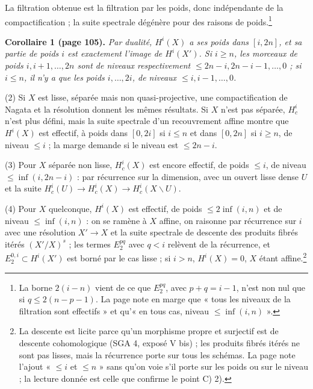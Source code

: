 \documentclass[11pt,a4paper]{article}
\begin{document}
La filtration obtenue est la filtration par les poids, donc indépendante de la
compactification ; la suite spectrale dégénère pour des raisons de
poids.\footnote{La borne $2(i-n)$ vient de ce que $E_{2}^{pq}$, avec $p + q =
i-1$, n'est non nul que si $q \leqslant 2(n-p-1)$. La page note en marge que
« tous les niveaux de la filtration sont effectifs » et qu'« en tous cas, niveau
$\leqslant \inf(i, n)$ ».}

\textbf{Corollaire 1 (page 105).} \emph{Par dualité, $H^{i}(X)$ a ses poids dans
$[i, 2n]$, et sa partie de poids $i$ est exactement l'image de $H^{i}(X')$. Si
$i \geqslant n$, les morceaux de poids $i, i+1, \ldots, 2n$ sont de niveaux
respectivement $\leqslant 2n-i, 2n-i-1, \ldots, 0$ ; si $i \leqslant n$, il n'y a
que les poids $i, \ldots, 2i$, de niveaux $\leqslant i, i-1, \ldots, 0$.}

(2) Si $X$ est lisse, séparée mais non quasi-projective, une compactification de
Nagata et la résolution donnent les mêmes résultats. Si $X$ n'est pas séparée,
$H^{i}_{c}$ n'est plus défini, mais la suite spectrale d'un recouvrement affine
montre que $H^{i}(X)$ est effectif, à poids dans $[0, 2i]$ si $i \leqslant n$ et
dans $[0, 2n]$ si $i \geqslant n$, de niveau $\leqslant i$ ; la marge demande si le
niveau est $\leqslant 2n-i$.

(3) Pour $X$ séparée non lisse, $H^{i}_{c}(X)$ est encore effectif, de poids
$\leqslant i$, de niveau $\leqslant \inf(i, 2n-i)$ : par récurrence sur la dimension,
avec un ouvert lisse dense $U$ et la suite $H^{i}_{c}(U) \to H^{i}_{c}(X) \to
H^{i}_{c}(X \smallsetminus U)$.

(4) Pour $X$ quelconque, $H^{i}(X)$ est effectif, de poids $\leqslant 2\inf(i, n)$
et de niveau $\leqslant \inf(i, n)$ : on se ramène à $X$ affine, on raisonne par
récurrence sur $i$ avec une résolution $X' \to X$ et la suite spectrale de
descente des produits fibrés itérés $(X'/X)^{s}$ ; les termes $E_{2}^{pq}$ avec
$q < i$ relèvent de la récurrence, et $E_{2}^{0,i} \subset H^{i}(X')$ est borné
par le cas lisse ; si $i > n$, $H^{i}(X) = 0$, $X$ étant affine.\footnote{La
descente est licite parce qu'un morphisme propre et surjectif est de descente
cohomologique (SGA 4, exposé V bis) ; les produits fibrés itérés ne sont pas
lisses, mais la récurrence porte sur tous les schémas. La page note l'ajout
« $\leqslant i$ et $\leqslant n$ » sans qu'on voie s'il porte sur les poids ou sur
le niveau ; la lecture donnée est celle que confirme le point C) 2).}
\end{document}
